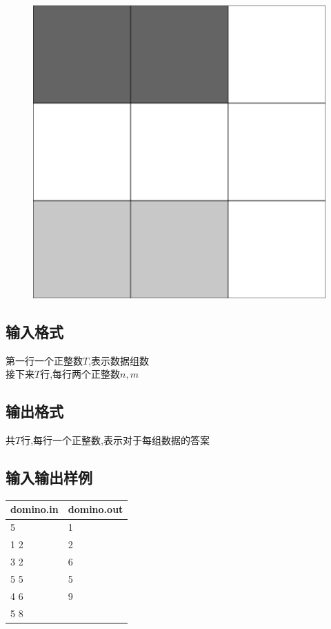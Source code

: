\documentclass[12pt]{ctexart}
\begin{document}
\begin{figure}[htbp]
\begin{minipage}[t]{0.3\textwidth}
			\caption{}
		\end{minipage}
		\begin{minipage}[t]{0.3\textwidth}
			\centering
			\includegraphics{pictures/1-3.png}
			\caption{}
		\end{minipage}
	\end{figure}

	\subsection{输入格式}
	第一行一个正整数$T$,表示数据组数\\
	接下来$T$行,每行两个正整数$n,m$
	\subsection{输出格式}
	共$T$行,每行一个正整数,表示对于每组数据的答案
	\subsection{输入输出样例}
	\begin{center}
		\begin{tabular}{|p{6cm}|p{6cm}|}
			\hline domino.in&domino.out\\
			\hline	5&1\\
					1 2&2\\
					3 2&6\\
					5 5&5\\
					4 6&9\\
					5 8&\\
			\hline
		\end{tabular}
	\end{center}
\end{document}
